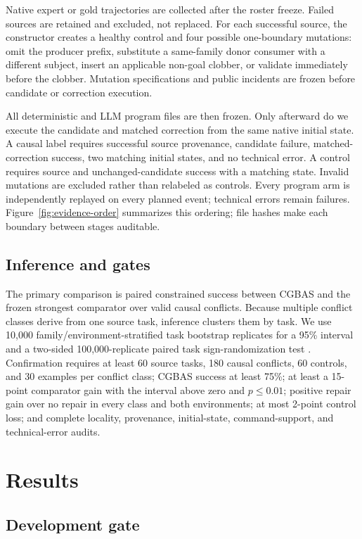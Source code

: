 \documentclass[10pt]{article}
\begin{document}
Native expert or gold trajectories are collected after the roster freeze. Failed
sources are retained and excluded, not replaced. For each successful source, the
constructor creates a healthy control and four possible one-boundary mutations:
omit the producer prefix, substitute a same-family donor consumer with a different
subject, insert an applicable non-goal clobber, or validate immediately before the
clobber. Mutation specifications and public incidents are frozen before candidate
or correction execution.

All deterministic and LLM program files are then frozen. Only afterward do we
execute the candidate and matched correction from the same native initial state.
A causal label requires successful source provenance, candidate failure,
matched-correction success, two matching initial states, and no technical error.
A control requires source and unchanged-candidate success with a matching state.
Invalid mutations are excluded rather than relabeled as controls. Every program
arm is independently replayed on every planned event; technical errors remain
failures.
Figure~\ref{fig:evidence-order} summarizes this ordering; file hashes make each
boundary between stages auditable.

\subsection{Inference and gates}
The primary comparison is paired constrained success between CGBAS and the frozen
strongest comparator over valid causal conflicts. Because multiple conflict
classes derive from one source task, inference clusters them by task. We use
10,000 family/environment-stratified task bootstrap replicates for a 95\% interval
and a two-sided 100,000-replicate paired task sign-randomization test
\citep{efron1994bootstrap}. Confirmation requires at least 60 source tasks, 180
causal conflicts, 60 controls, and 30 examples per conflict class; CGBAS success
at least 75\%; at least a 15-point comparator gain with the interval above zero
and $p\leq0.01$; positive repair gain over no repair in every class and both
environments; at most 2-point control loss; and complete locality, provenance,
initial-state, command-support, and technical-error audits.

\section{Results}

\subsection{Development gate}

\end{document}
